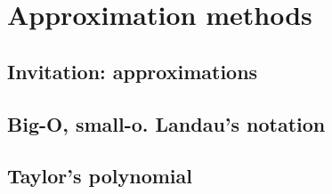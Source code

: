 \chapter{Approximation methods}

\section{Invitation: approximations}

\section{Big-O, small-o. Landau's notation}

\section{Taylor's polynomial}
